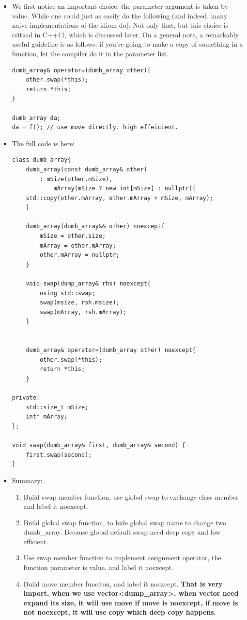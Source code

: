 \documentclass[a4paper,11pt,twoside]{book}
\begin{document}
\begin{itemize}
	\item We first notice an important choice: the parameter argument is taken by-value. While one could just as easily do the following (and indeed, many naive implementations of the idiom do): Not only that, but this choice is critical in C++11, which is discussed later. On a general note, a remarkably useful guideline is as follows: if you're going to make a copy of something in a function, let the compiler do it in the parameter list.
	
\begin{lstlisting}[numbers=none]
dumb_array& operator=(dumb_array other){
	other.swap(*this); 
	return *this;
}	

dumb_array da;
da = f(); // use move directly. high effeicient.
\end{lstlisting}
	

\item The full code is here:
\begin{lstlisting}[numbers=none]
class dumb_array{
	dumb_array(const dumb_array& other)
		: mSize(other.mSize),
			mArray(mSize ? new int[mSize] : nullptr){
	std::copy(other.mArray, other.mArray + mSize, mArray);
	}

	dumb_array(dumb_array&& other) noexcept{
		mSize = other.size;
		mArray = other.mArray;
		other.mArray = nullptr;
	}

	void swap(dump_array& rhs) noexcept{
		using std::swap;
		swap(msize, rsh.msize);
		swap(mArray, rsh.mArray);
	}

	
	dumb_array& operator=(dumb_array other) noexcept{
		other.swap(*this); 
		return *this;
	}

private:
	std::size_t mSize;
	int* mArray;
};

void swap(dumb_array& first, dumb_array& second) {
	first.swap(second);
}
\end{lstlisting}
\item Summary:
\begin{enumerate}
	\item Build swap member function, use global swap to exchange class member and label it noexcept.
	\item Build global swap function, to hide global swap name to change two dumb\_array. Because global default swap need deep copy and low efficient. 
	\item Use swap member function to implement assignment operator, the function parameter is value, and label it noexcept. 
	\item Build move member funciton, and label it noexcept. \textbf{That is very import, when we use vector<dump\_array>, when vector need expand its size, it will use move if move is noexcept, if move is not noexcept, it will use copy which deep copy happens. }
\end{enumerate}
\end{itemize}
	
\end{document}
